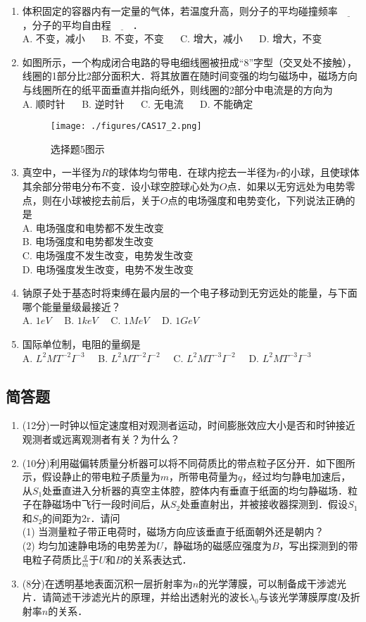 \begin{enumerate}
\item 体积固定的容器内有一定量的气体，若温度升高，则分子的平均碰撞频率$\underline{~~~~~~~~~~}$，分子的平均自由程$\underline{~~~~~~~~~~}$．\\
A. 不变，减小 $\quad$
B. 不变，不变 $\quad$
C. 增大，减小 $\quad$
D. 增大，不变 $\quad$

\item 如图所示，一个构成闭合电路的导电细线圈被扭成“8”字型（交叉处不接触），线圈的1部分比2部分面积大．将其放置在随时间变强的均匀磁场中，磁场方向与线圈所在的纸平面垂直并指向纸外，则线圈的2部分中电流是的方向为\\
A. 顺时针 $\quad$
B. 逆时针 $\quad$
C. 无电流 $\quad$
D. 不能确定 $\quad$
\begin{figure}[ht]
\centering
\texttt{[image: ./figures/CAS17\_2.png]}
\caption{选择题5图示} \label{CAS17_fig2}
\end{figure}
\item 真空中，一半径为$R$的球体均匀带电．在球内挖去一半径为$r$的小球，且使球体其余部分带电分布不变．设小球空腔球心处为$O$点．如果以无穷远处为电势零点，则在小球被挖去前后，关于$O$点的电场强度和电势变化，下列说法正确的是\\
A. 电场强度和电势都不发生改变 \\
B. 电场强度和电势都发生改变 \\
C. 电场强度不发生改变，电势发生改变 \\
D. 电场强度发生改变，电势不发生改变 \\
\item 钠原子处于基态时将束缚在最内层的一个电子移动到无穷远处的能量，与下面哪个能量量级最接近？\\
A. $1eV\quad$
B. $1keV\quad$
C. $1MeV\quad$
D. $1GeV\quad$
\item 国际单位制，电阻的量纲是\\
A. $L^{2}MT^{-2}I^{-3}\quad$
B. $L^{2}MT^{-2}I^{-2}\quad$
C. $L^{2}MT^{-3}I^{-2}\quad$
D. $L^{2}MT^{-3}I^{-3}\quad$
\end{enumerate}
\subsection{简答题}
\begin{enumerate}
\item (12分)一时钟以恒定速度相对观测者运动，时间膨胀效应大小是否和时钟接近观测者或远离观测者有关？为什么？
\item (10分)利用磁偏转质量分析器可以将不同荷质比的带点粒子区分开．如下图所示，假设静止的带电粒子质量为$m$，所带电荷量为$q$，经过均匀静电加速后，从$S_{1}$处垂直进入分析器的真空主体腔，腔体内有垂直于纸面的均匀静磁场．粒子在静磁场中飞行一段时间后，从$S_{2}$处垂直射出，并被接收器探测到．假设$S_{1}$和$S_{2}$的间距为2r．请问\\
(1) 当测量粒子带正电荷时，磁场方向应该垂直于纸面朝外还是朝内？\\
(2) 均匀加速静电场的电势差为$U$，静磁场的磁感应强度为$B$，写出探测到的带电粒子荷质比$\frac{q}{m}$于$U$和$B$的关系表达式．
\item (8分)在透明基地表面沉积一层折射率为$n$的光学薄膜，可以制备成干涉滤光片．请简述干涉滤光片的原理，并给出透射光的波长$\lambda_{0}$与该光学薄膜厚度$l$及折射率$n$的关系．
\end{enumerate}
